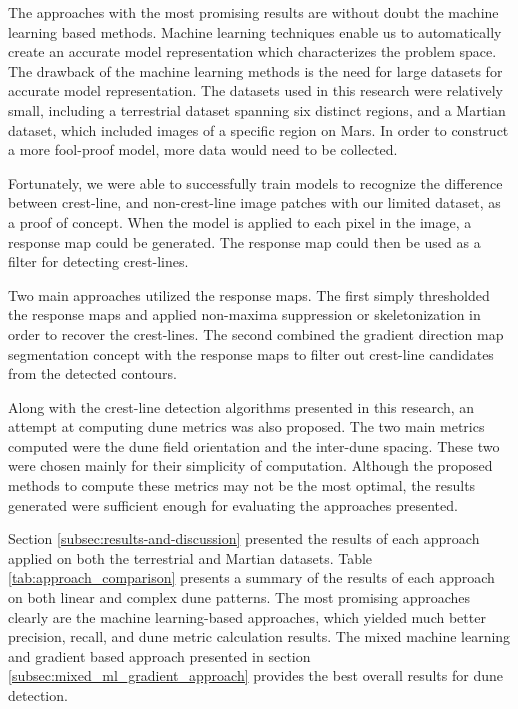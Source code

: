 The approaches with the most promising results are without doubt the machine learning based methods. Machine learning techniques enable us to automatically create an accurate model representation which characterizes the problem space. The drawback of the machine learning methods is the need for large datasets for accurate model representation. The datasets used in this research were relatively small, including a terrestrial dataset spanning six distinct regions, and a Martian dataset, which included images of a specific region on Mars. In order to construct a more fool-proof model, more data would need to be collected.

Fortunately, we were able to successfully train models to recognize the difference between crest-line, and non-crest-line image patches with our limited dataset, as a proof of concept. When the model is applied to each pixel in the image, a response map could be generated. The response map could then be used as a filter for detecting crest-lines. 

Two main approaches utilized the response maps. The first simply thresholded the response maps and applied non-maxima suppression or skeletonization in order to recover the crest-lines. The second combined the gradient direction map segmentation concept with the response maps to filter out crest-line candidates from the detected contours.

Along with the crest-line detection algorithms presented in this research, an attempt at computing dune metrics was also proposed. The two main metrics computed were the dune field orientation and the inter-dune spacing. These two were chosen mainly for their simplicity of computation. Although the proposed methods to compute these metrics may not be the most optimal, the results generated were sufficient enough for evaluating the approaches presented.

Section \ref{subsec:results-and-discussion} presented the results of each approach applied on both the terrestrial and Martian datasets. Table \ref{tab:approach_comparison} presents a summary of the results of each approach on both linear and complex dune patterns. The most promising approaches clearly are the machine learning-based approaches, which yielded much better precision, recall, and dune metric calculation results. The mixed machine learning and gradient based approach presented in section \ref{subsec:mixed_ml_gradient_approach} provides the best overall results for dune detection. 

